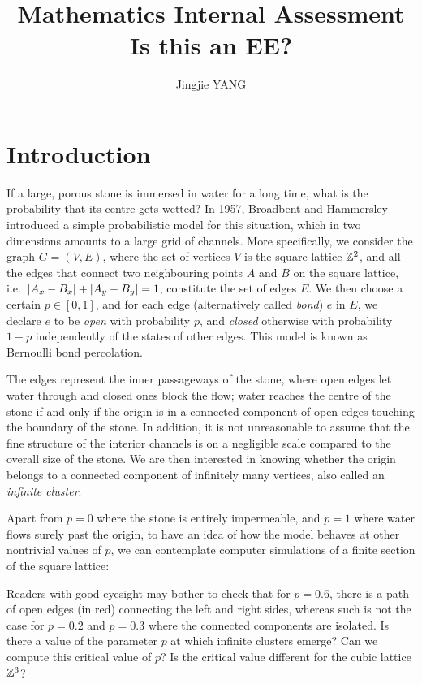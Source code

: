 \documentclass[a4paper, 12pt]{article}
\title{
\textbf{Mathematics Internal Assessment}\\
\bigskip
Is this an EE?
}
\author{Jingjie YANG}
\date{}
\begin{document}
\maketitle

\section{Introduction}\label{ch:intro}
If a large, porous stone is immersed in water for a long time, what is the probability that its centre gets wetted? In 1957, Broadbent and Hammersley \autocite*[693]{broadbent_hammersley_1957} introduced a simple probabilistic model for this situation, which in two dimensions amounts to a large grid of channels. More specifically, we consider the graph $G = (V, E)$, where the set of vertices $V$ is the square lattice $\mathbb{Z}^2$, and all the edges that connect two neighbouring points $A$ and $B$ on the square lattice, i.e.\ $\lvert A_x - B_x \rvert + \lvert A_y - B_y \rvert = 1$, constitute the set of edges $E$. We then choose a certain $p \in [0, 1]$, and for each edge (alternatively called \textit{bond}) $e$ in $E$, we declare $e$ to be \textit{open} with probability $p$, and \textit{closed} otherwise with probability $1 - p$ independently of the states of other edges. This model is known as Bernoulli bond percolation.



The edges represent the inner passageways of the stone, where open edges let water through and closed ones block the flow; water reaches the centre of the stone if and only if the origin is in a connected component of open edges touching the boundary of the stone. In addition, it is not unreasonable to assume that the fine structure of the interior channels is on a negligible scale compared to the overall size of the stone. We are then interested in knowing whether the origin belongs to a connected component of infinitely many vertices, also called an \textit{infinite cluster}. 

Apart from $p = 0$ where the stone is entirely impermeable, and $p = 1$ where water flows surely past the origin, to have an idea of how the model behaves at other nontrivial values of $p$, we can contemplate computer simulations of a finite section of the square lattice:


\break 

Readers with good eyesight may bother to check that for $p = 0.6$, there is a path of open edges (in red) connecting the left and right sides, whereas such is not the case for $p = 0.2$ and $p = 0.3$ where the connected components are isolated. Is there a value of the parameter $p$ at which infinite clusters emerge? Can we compute this critical value of $p$? Is the critical value different for the cubic lattice $\mathbb{Z}^3$? 
\end{document}
